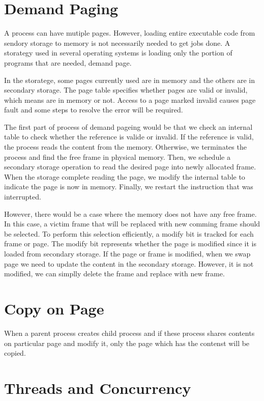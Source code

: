 \section{Demand Paging}
\label{sec:history}
A process can have mutiple pages. However, loading entire executable code from sendory storage to memory is not necessarily needed to 
get jobs done. A storategy used in several operating systems is loading only the portion of programs that are needed, demand page. 

In the storatege, some pages currently used are in memory and the others are in secondary storage. 
The page table specifies whether pages are valid or invalid, which means are in memory or not. 
Access to a page marked invalid causes page fault and some steps to resolve the error will be required. 

The first part of process of demand pageing would be that we check an internal table to check whether the reference is valide or invalid.
If the reference is valid, the process reads the content from the memory. Otherwise, we terminates the process and find the free frame in 
physical memory. Then, we schedule a secondary storage operation to read the desired page into newly allocated frame. 
When the storage complete reading the page, we modify the internal table to indicate the page is now in memory. 
Finally, we restart the instruction that was interrupted. 

However, there would be a case where the memory does not have any free frame. In this case, a victim frame that will be replaced with new comming frame should be selected. 
To perform this selection efficiently, a modify bit is tracked for each frame or page. The modify bit represents whether the page is modified since it is loaded from secondary storage. 
If the page or frame is modified, when we swap page we need to update the content in the secondary storage. However, it is not modified, we can simplly delete the frame and replace with new frame.



\section{Copy on Page}
\label{sec:history}
When a parent process creates child process and if these process shares contents on particular page and modify it, 
only the page which has the contenst will be copied.


\section{Threads and Concurrency}
\label{sec:history}


